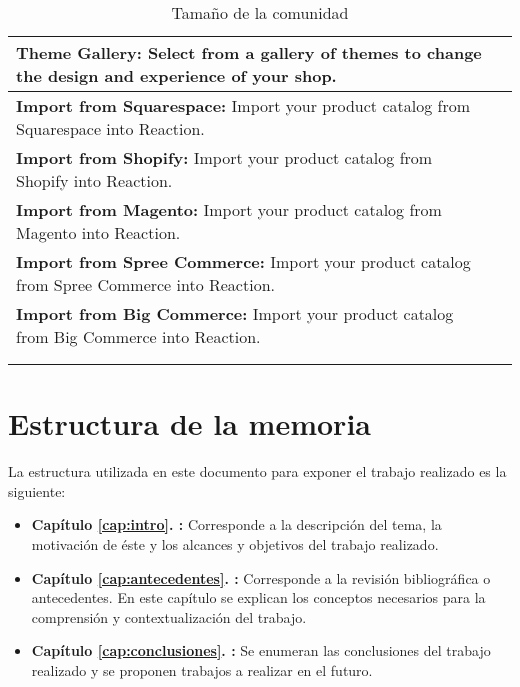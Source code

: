 \begin{table}[h!]
\begin{tabular}{ |L{0.6\paperwidth}|L{0.1\paperwidth}|}
\\ \hline
	\textbf{ Theme Gallery:} Select from a gallery of themes to change the design and experience of your shop.&
	
\\ \hline
	\textbf{ Import from Squarespace:} Import your product catalog from Squarespace into Reaction.&
	
\\ \hline
	 \textbf{ Import from Shopify:} Import your product catalog from Shopify into Reaction.&
	
\\ \hline
	\textbf{ Import from Magento:} Import your product catalog from Magento into Reaction.&
	
\\ \hline
	\textbf{ Import from Spree Commerce:} Import your product catalog from Spree Commerce into Reaction.&
	
\\ \hline
	\textbf{ Import from Big Commerce:} Import your product catalog from Big Commerce into Reaction.&
	
\\ \hline
	&
	
\\ \hline
	&
				
\\ \hline
\end{tabular}
    \caption{ Tamaño de la comunidad}
    \label{tab:task_proyect}
\end{table}


\section{Estructura de la memoria}\label{cap:intro:estructura}
La estructura utilizada en este documento para exponer el trabajo realizado es la siguiente:

\begin{itemize}
	\item \textbf{Capítulo \ref{cap:intro}. :} Corresponde a la descripción del tema, la motivación de éste y los alcances y objetivos del trabajo realizado.
	
	\item \textbf{Capítulo \ref{cap:antecedentes}. :} Corresponde a la revisión bibliográfica o antecedentes. En este capítulo se explican los conceptos necesarios para la comprensión y contextualización del trabajo.
	
	\item \textbf{Capítulo \ref{cap:conclusiones}. :}	Se enumeran las conclusiones del trabajo realizado y se proponen trabajos a realizar en el futuro.
\end{itemize}